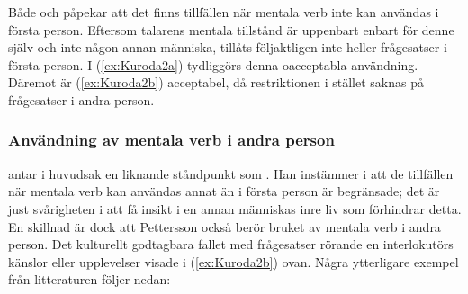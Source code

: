 \documentclass[12pt,a4paper]{article}
\begin{document}
\begin{exe}
\end{exe}

Både \textcite{kuno1973} och \textcite{kuroda1973} påpekar att det finns tillfällen när mentala verb inte kan användas i första person. Eftersom talarens mentala tillstånd är uppenbart enbart för denne själv och inte någon annan människa, tillåts följaktligen inte heller frågesatser i första person. I (\ref{ex:Kuroda2a}) tydliggörs denna oacceptabla användning. Däremot är (\ref{ex:Kuroda2b}) acceptabel, då restriktionen i stället saknas på frågesatser i andra person.

\begin{exe}
\ex
\begin{xlist}
\end{xlist}
\end{exe}

\subsubsection{Användning av mentala verb i andra person}
\label{subsec:Bakgrund: Mentala verb: Användning av mentala verb i andra person}
\textcite{pettersson1995} antar i huvudsak en liknande ståndpunkt som \textcite{hasegawa2015}. Han instämmer i att de tillfällen när mentala verb kan användas annat än i första person är begränsade; det är just svårigheten i att få insikt i en annan människas inre liv som förhindrar detta. En skillnad är dock att Pettersson också berör bruket av mentala verb i andra person. Det kulturellt godtagbara fallet med frågesatser rörande en interlokutörs känslor eller upplevelser visade i (\ref{ex:Kuroda2b}) ovan. Några ytterligare exempel från litteraturen följer nedan:
\end{document}
